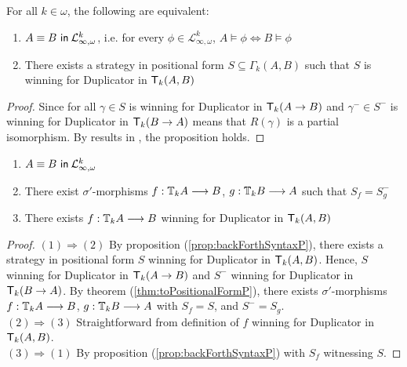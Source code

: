 \begin{prop}
For all $k \in \omega$, the following are equivalent:
\begin{enumerate}[label=(\arabic*)$_{k}$]
\item ${A \equiv B \ \mathsf{in}\: \mathcal{L}^{k}_{\infty,\omega}}$, i.e. for every $\phi \in \mathcal{L}^{k}_{\infty,\omega}$, $A \vDash \phi \Leftrightarrow B \vDash \phi$
\item There exists a strategy in positional form $S \subseteq \Gamma_{k}(A,B)$ such that $S$ is winning for Duplicator in ${\mathsf{T}_{k}(A,B)}$
\end{enumerate}
\begin{proof}
Since for all $\gamma \in S$ is winning for Duplicator in ${\mathsf{T}_{k}(A \rightarrow B)}$ and $\gamma^{-} \in S^{-}$ is winning for Duplicator in ${\mathsf{T}_{k}(B \rightarrow A)}$ means that $R(\gamma)$ is a partial isomorphism. By results in \cite{Immerman1982}, the proposition holds.
\end{proof}
\begin{cor}
\begin{enumerate}[label=(\arabic*)]
\item ${A \equiv B \ \mathsf{in}\: \mathcal{L}^{k}_{\infty,\omega}}$ 
\item There exist $\sigma'$-morphisms $f:{\mathbb{T}_{k}A} \longrightarrow B$, $g:{\mathbb{T}_{k}B} \longrightarrow A$ such that $S_{f} = S_{g}^{-}$ 
\item There exists $f:{\mathbb{T}_{k}A} \longrightarrow B$ winning for Duplicator in ${\mathsf{T}_{k}(A,B)}$ 
\end{enumerate}
\begin{proof}
$(1) \Rightarrow (2)$ By proposition (\ref{prop:backForthSyntaxP}), there exists a strategy in positional form $S$ winning for Duplicator in ${\mathsf{T}_{k}(A,B)}$. Hence, $S$ winning for Duplicator in ${\mathsf{T}_{k}(A \rightarrow B)}$ and $S^{-}$ winning for Duplicator in ${\mathsf{T}_{k}(B \rightarrow A)}$. By theorem (\ref{thm:toPositionalFormP}), there exists $\sigma'$-morphisms $f:{\mathbb{T}_{k}A} \longrightarrow B$, $g:{\mathbb{T}_{k}B} \longrightarrow A$ with $S_{f} = S$, and $S^{-} = S_{g}$. \\ 
$(2) \Rightarrow (3)$ Straightforward from definition of $f$ winning for Duplicator in ${\mathsf{T}_{k}(A,B)}$. \\ 
$(3) \Rightarrow (1)$ By proposition (\ref{prop:backForthSyntaxP}) with $S_{f}$ witnessing $S$.  
\end{proof}
\label{cor:backForthP}
\end{cor}
\label{prop:backForthSyntaxP}
\end{prop}
